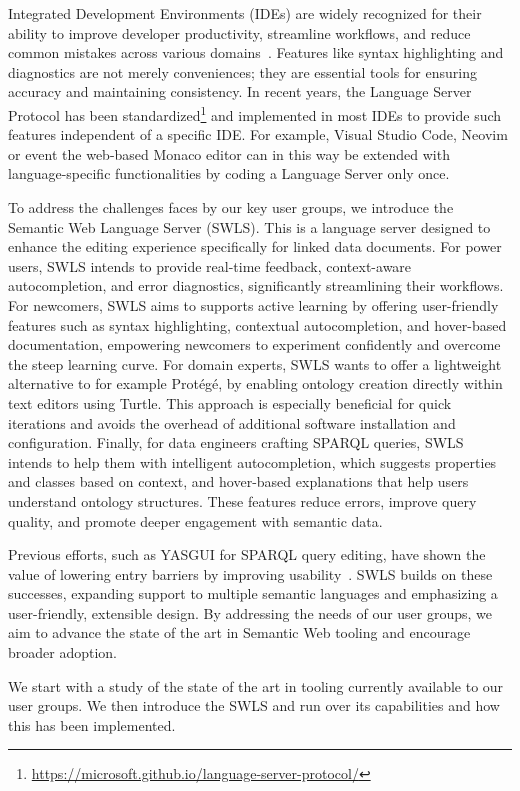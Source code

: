 Integrated Development Environments (IDEs) are widely recognized for their ability to improve developer productivity, streamline workflows, and reduce common mistakes across various domains~\cite{javaEngineer}. 
Features like syntax highlighting and diagnostics are not merely conveniences; they are essential tools for ensuring accuracy and maintaining consistency. 
In recent years, the Language Server Protocol has been standardized\footnote{\url{https://microsoft.github.io/language-server-protocol/}} and implemented in most IDEs to provide such features independent of a specific IDE.
For example, Visual Studio Code, Neovim or event the web-based Monaco editor can in this way be extended with language-specific functionalities by coding a Language Server only once.

To address the challenges faces by our key user groups, we introduce the Semantic Web Language Server (SWLS).
This is a language server designed to enhance the editing experience specifically for linked data documents. 
For power users, SWLS intends to provide real-time feedback, context-aware autocompletion, and error diagnostics, significantly streamlining their workflows.
For newcomers, SWLS aims to supports active learning by offering user-friendly features such as syntax highlighting, contextual autocompletion, and hover-based documentation, empowering newcomers to experiment confidently and overcome the steep learning curve.
For domain experts, SWLS wants to offer a lightweight alternative to for example Protégé, by enabling ontology creation directly within text editors using Turtle.
This approach is especially beneficial for quick iterations and avoids the overhead of additional software installation and configuration.
Finally, for data engineers crafting SPARQL queries, SWLS intends to help them with intelligent autocompletion, which suggests properties and classes based on context, and hover-based explanations that help users understand ontology structures.
These features reduce errors, improve query quality, and promote deeper engagement with semantic data.


Previous efforts, such as YASGUI for SPARQL query editing, have shown the value of lowering entry barriers by improving usability~\cite{10.3233/SW-150197,10.1007/978-3-642-41242-4_7}. 
SWLS builds on these successes, expanding support to multiple semantic languages and emphasizing a user-friendly, extensible design. 
By addressing the needs of our user groups, we aim to advance the state of the art in Semantic Web tooling and encourage broader adoption.

We start with a study of the state of the art in tooling currently available to our user groups.
We then introduce the SWLS and run over its capabilities and how this has been implemented.
